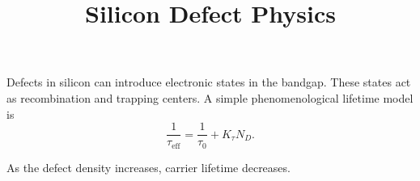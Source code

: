 \documentclass[11pt]{article}
\title{Silicon Defect Physics}
\begin{document}
\maketitle

Defects in silicon can introduce electronic states in the bandgap. These states act as recombination and trapping centers. A simple phenomenological lifetime model is
\[
\frac{1}{\tau_{\mathrm{eff}}} = \frac{1}{\tau_0} + K_\tau N_D.
\]

As the defect density increases, carrier lifetime decreases.
\end{document}
